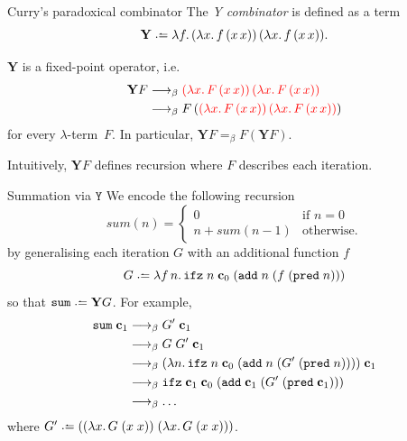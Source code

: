 \begin{frame}{Curry's paradoxical combinator}
  The \emph{Y combinator} is defined as a term 
  \[
    \mathbf{Y} \defeq \lambda f.\, (\lambda x.\, f\,(x\,x))\,(\lambda
    x.\,f\,(x\,x)).
  \]
\begin{proposition}
  $\mathbf{Y}$ is a fixed-point operator, i.e.\ 
  \begin{align*}
    \mathbf{Y}F
    & \longrightarrow_{\beta} {\color{red} (\lambda x.\,F\,(x\,x))\,(\lambda x.\, F\,(x\,x))} \\
    & \longrightarrow_{\beta} F\,({\color{red}(\lambda x.\,F\,(x\,x))\,(\lambda x.\, F\,(x\,x))}) \\
  \end{align*}
  for every $\lambda$-term~$F$. In particular, $\mathbf{Y}F =_\beta F(\mathbf{Y}F)$.
\end{proposition}
Intuitively, $\mathbf{Y}F$ defines recursion where $F$ describes each iteration. 
\end{frame}


\begin{frame}{Summation via $\mathtt{Y}$}
  We encode the following recursion
  \[
    \mathit{sum}(n) =
      \begin{cases} 
       0 & \text{if } n = 0 \\
       n + \mathit{sum}(n - 1)  & \text{otherwise}.
      \end{cases}
  \]
  by generalising each iteration $G$ with an additional function $f$
  \[
    G \defeq \lambda f\,n.\, \mathtt{ifz}\;n\;\bc_0\; (\add\;n\;(f\;(\mathtt{pred}\;n)))
  \]
  so that $\mathtt{sum} \defeq \mathbf{Y}G$. For example, 
  \begin{align*}
    \mathtt{sum}\;\mathbf{c}_1
      &\longrightarrow_{\beta} G'\;\mathbf{c}_1 \\
      &\longrightarrow_{\beta} G\;G'\;\mathbf{c}_1 \\
      &\longrightarrow_{\beta} (\lambda n.\, \mathtt{ifz}\;n\;\mathbf{c}_0\;
      (\mathtt{add}\;n\;(G'\;(\mathtt{pred}\;n))))\;\mathbf{c}_1 \\
      &\longrightarrow_{\beta} \mathtt{ifz}\;\mathbf{c}_1\;\mathbf{c}_0\;
      (\mathtt{add}\;\mathbf{c}_1\;(G'\;(\mathtt{pred}\;\mathbf{c}_1))) \\
      &\longrightarrow_{\beta} \dots
  \end{align*}
  where
  $G' \defeq ((\lambda x.\, G\;(x\;x))\;(\lambda x.\,G\;(x\;x)))$.
\end{frame}
  
